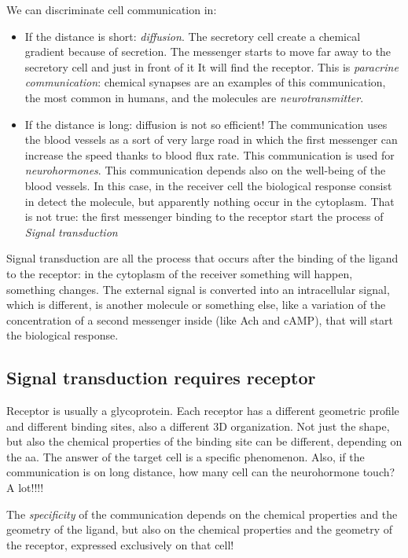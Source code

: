 \documentclass[a4paper, 12pt]{book}
\begin{document}
We can discriminate cell communication in:
\begin{itemize}
\item{If the distance is short: \emph{diffusion}. The secretory cell create a chemical gradient because of secretion. The messenger starts to move far away to the secretory cell and just in front of it It will find the receptor. This is \emph{paracrine communication}: chemical synapses are an examples of this communication, the most common in humans, and the molecules are \emph{neurotransmitter}.}
\item{If the distance is long: diffusion is not so efficient! The communication uses the blood vessels as a sort of very large road in which the first messenger can increase the speed thanks to blood flux rate. This communication is used for \emph{neurohormones}. This communication depends also on the well-being of the blood vessels. In this case, in the receiver cell the biological response consist in detect the molecule, but apparently nothing occur in the cytoplasm. That is not true: the first messenger binding to the receptor start the process of \emph{Signal transduction}}
\end{itemize} 

Signal transduction are all the process that occurs after the binding of the ligand to the receptor: in the cytoplasm of the receiver something will happen, something changes. The external signal is converted into an intracellular signal, which is different, is another molecule or something else, like a variation of the concentration of a second messenger inside (like Ach and cAMP), that will start the biological response.

\subsection{Signal transduction requires receptor}
Receptor is usually a glycoprotein. Each receptor has a different geometric profile and different binding sites, also a different 3D organization. Not just the shape, but also the chemical properties of the binding site can be different, depending on the aa. The answer of the target cell is a specific phenomenon.  Also, if the communication is on long distance, how many cell can the neurohormone touch? A lot!!!!

The \emph{specificity} of the communication depends on the chemical properties and the geometry of the ligand, but also on the chemical properties and the geometry of the receptor, expressed exclusively on that cell!
\end{document}
